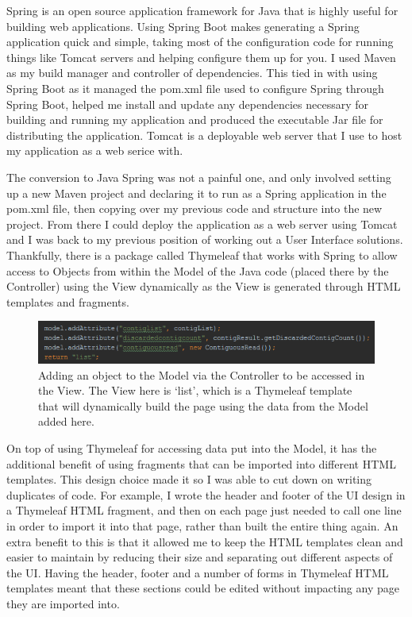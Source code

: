 Spring is an open source application framework for Java that is highly useful for building web applications. Using Spring Boot makes generating a Spring application quick and simple, taking most of the configuration code for running things like Tomcat servers and helping configure them up for you. I used Maven as my build manager and controller of dependencies. This tied in with using Spring Boot as it managed the pom.xml file used to configure Spring through Spring Boot, helped me install and update any dependencies necessary for building and running my application and produced the executable Jar file for distributing the application. Tomcat is a deployable web server that I use to host my application as a web serice with.

The conversion to Java Spring was not a painful one, and only involved setting up a new Maven project and declaring it to run as a Spring application in the pom.xml file, then copying over my previous code and structure into the new project. From there I could deploy the application as a web server using Tomcat and I was back to my previous position of working out a User Interface solutions. Thankfully, there is a package called Thymeleaf\cite{thymeleaf} that works with Spring to allow access to Objects from within the Model of the Java code (placed there by the Controller) using the View dynamically as the View is generated through HTML templates and fragments.

\begin{figure}[H]
	\centering
\includegraphics[width=1\textwidth]{images/addingtomodel}
\caption{Adding an object to the Model via the Controller to be accessed in the View. The View here is `list', which is a Thymeleaf template that will dynamically build the page using the data from the Model added here.}
\end{figure}

On top of using Thymeleaf for accessing data put into the Model, it has the additional benefit of using fragments that can be imported into different HTML templates. This design choice made it so I was able to cut down on writing duplicates of code. For example, I wrote the header and footer of the UI design in a Thymeleaf HTML fragment, and then on each page just needed to call one line in order to import it into that page, rather than built the entire thing again. An extra benefit to this is that it allowed me to keep the HTML templates clean and easier to maintain by reducing their size and separating out different aspects of the UI. Having the header, footer and a number of forms in Thymeleaf HTML templates meant that these sections could be edited without impacting any page they are imported into.

